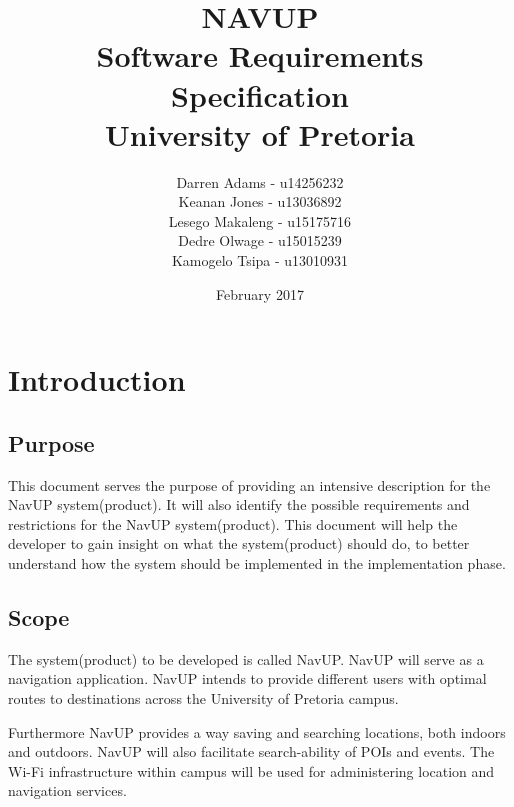 \documentclass{article}
\title{NAVUP\\ Software Requirements Specification\\ University of Pretoria}
\author{Darren Adams\hspace{2 cm} - u14256232\\ Keanan Jones\hspace{2 cm} - u13036892\\ Lesego Makaleng\hspace{2 cm} - u15175716\\ Dedre Olwage\hspace{2 cm} - u15015239\\ Kamogelo Tsipa\hspace{2 cm} - u13010931 }
\date{February 2017}
\begin{document}
\maketitle
\pagebreak
\tableofcontents
\pagebreak
\section{Introduction}
    \subsection{Purpose}
		\begin{flushleft}
			This document serves the purpose of providing an intensive description for the NavUP system(product). It will also identify the possible requirements and restrictions for the NavUP system(product). This document will help the developer to gain insight on what the system(product) should do, to better understand how the system should be implemented in the implementation phase.
		\end{flushleft}
    \subsection{Scope}
		\begin{flushleft}
			The system(product) to be developed is called NavUP. NavUP will serve as a navigation application. NavUP intends to provide different users with optimal routes to destinations across the University of Pretoria campus.
			
			Furthermore NavUP provides a way saving and searching locations, both indoors and outdoors. NavUP will also facilitate search-ability of POIs and events. The Wi-Fi infrastructure within campus will be used for administering location and navigation services.
		\end{flushleft}
\end{document}
